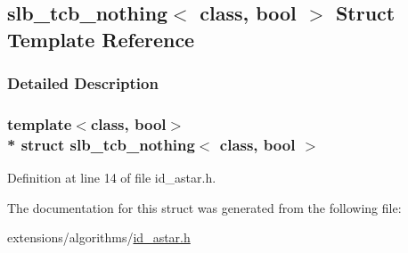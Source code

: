\hypertarget{structslb__tcb__nothing}{}\subsection{slb\+\_\+tcb\+\_\+nothing$<$ class, bool $>$ Struct Template Reference}
\label{structslb__tcb__nothing}


\subsubsection{Detailed Description}
\subsubsection*{template$<$class, bool$>$\\*
struct slb\+\_\+tcb\+\_\+nothing$<$ class, bool $>$}



Definition at line 14 of file id\+\_\+astar.\+h.



The documentation for this struct was generated from the following file\+:\begin{DoxyCompactItemize}
\item 
extensions/algorithms/\hyperlink{id__astar_8h}{id\+\_\+astar.\+h}\end{DoxyCompactItemize}
